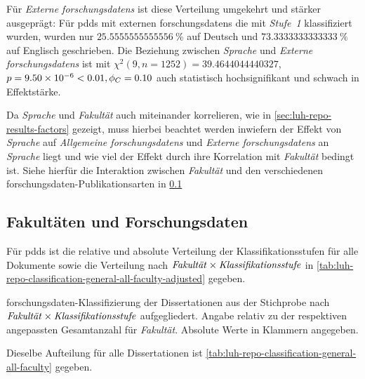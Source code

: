 Für \textit{Externe \glspl{forschungsdaten}} ist diese Verteilung umgekehrt und stärker ausgeprägt:
Für \glspl{pdd} mit externen \glspl{forschungsdaten} die mit \textit{Stufe~1} klassifiziert wurden, wurden nur $\SI[round-mode=places,round-precision=2]{25,5555555555556}{\percent}$ auf Deutsch und $\SI[round-mode=places,round-precision=2]{73,3333333333333}{\percent}$ auf Englisch geschrieben.
Die Beziehung zwischen \textit{Sprache} und \textit{Externe \glspl{forschungsdaten}} ist mit $\chi^2 (\num{9}, n=\num{1252}) = \num[round-mode=places,round-precision=2]{39.4644044440327}$, $p = \num[round-mode=places,round-precision=2]{9.49823708731411E-06}<\num{0.01},\phi_C=\num[round-mode=places,round-precision=2]{0.102503804500984}$ auch statistisch hochsignifikant und schwach in Effektstärke.

Da \textit{Sprache} und \textit{Fakultät} auch miteinander korrelieren, wie in \cref{sec:luh-repo-results-factors} gezeigt, muss hierbei beachtet werden inwiefern der Effekt von \textit{Sprache} auf \textit{Allgemeine \glspl{forschungsdaten}} und \textit{Externe \glspl{forschungsdaten}} an \textit{Sprache} liegt und wie viel der Effekt durch ihre Korrelation mit \textit{Fakultät} bedingt ist.
Siehe hierfür die Interaktion zwischen \textit{Fakultät} und den verschiedenen \gls{forschungsdaten}-Publikationsarten in \cref{sec:luh-repo-results-faculties}

\subsection{Fakultäten und Forschungsdaten}\label{sec:luh-repo-results-faculties}
Für \glspl{pdd} ist die relative und absolute Verteilung der Klassifikationsstufen für alle Dokumente sowie die Verteilung nach $\text{\textit{Fakultät}}\times\text{\textit{Klassifikationsstufe}}$ in \cref{tab:luh-repo-classification-general-all-faculty-adjusted} gegeben.
\begin{table}[!htbp]
	\caption{\gls{forschungsdaten}-Klassifizierung der Dissertationen aus der Stichprobe nach $\text{\textit{Fakultät}}\times\text{\textit{Klassifikationsstufe}}$ aufgegliedert.
    Angabe relativ zu der respektiven angepassten Gesamtanzahl für \textit{Fakultät}.
    Absolute Werte in Klammern angegeben.}
    
    \label{tab:luh-repo-classification-general-all-faculty-adjusted}
\end{table}
Dieselbe Aufteilung für alle Dissertationen ist \cref{tab:luh-repo-classification-general-all-faculty} gegeben.

